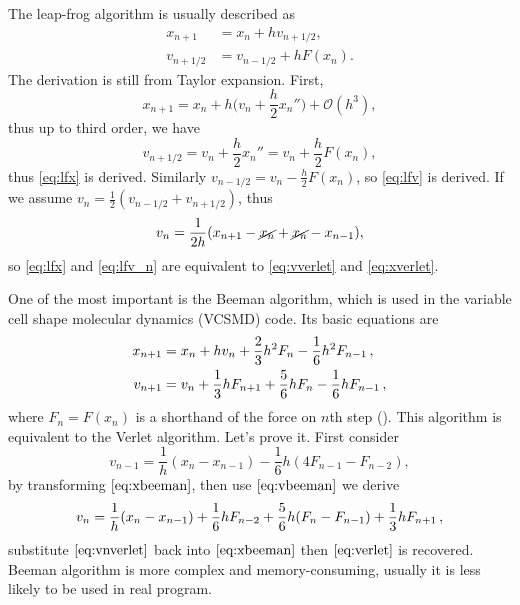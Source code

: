 The leap-frog algorithm is usually described as
\begin{subequations}
	\begin{align}
		x_{n+1}   & = x_n + h v_{n+1/2}, \label{eq:lfx}   \\
		v_{n+1/2} & = v_{n-1/2} + h F(x_n).\label{eq:lfv}
	\end{align}
\end{subequations}
The derivation is still from Taylor expansion. First,
\begin{equation}
	x_{n+1} = x_{n} + h \bigg(v_n + \frac{ h }{ 2 } x_n'' \bigg) + \mathcal{O}(h^3),
\end{equation}
thus up to third order, we have
\begin{equation}
	v_{n + 1/2} = v_n + \frac{ h }{ 2 } x_n'' = v_n + \frac{ h }{ 2 } F(x_n),
\end{equation}
thus \eqref{eq:lfx} is derived.
Similarly $v_{n-1/2} = v_n - \frac{ h }{ 2 } F(x_n)$, so \eqref{eq:lfv} is derived.
If we assume $v_n = \frac{ 1 }{ 2 }(v_{n-1/2} + v_{n+1/2})$, thus
\begin{equation}\label{eq:lfv_n}
	v_n = \frac{ 1 }{ 2h }(x_{n+1} - \cancel{x_n} + \cancel{x_n} - x_{n-1}),
\end{equation}
so \eqref{eq:lfx} and \eqref{eq:lfv_n} are equivalent to \eqref{eq:vverlet} and \eqref{eq:xverlet}.

One of the most important is the Beeman algorithm, which is used in the
variable cell shape molecular dynamics (VCSMD) code.
Its basic equations are
\begin{subequations}\label{eq:beeman}
	\begin{align}
		x_{n+1} & = x_n + h v_n + \frac{ 2 }{ 3 } h^2 F_n - \frac{ 1 }{ 6 } h^2 F_{n-1} \thinspace,
		\label{eq:xbeeman}                                                                             \\
		v_{n+1} & = v_n + \frac{ 1 }{ 3 }h F_{n+1} + \frac{ 5 }{ 6 } h F_n - \frac{ 1 }{ 6 } h F_{n-1}
		\thinspace,
		\label{eq:vbeeman}
	\end{align}
\end{subequations}
where $F_n = F(x_n)$ is a shorthand of the force on $n$th step (\cite{dufty1986molecular}). This algorithm
is equivalent to the Verlet algorithm. Let's prove it. First consider
\begin{equation}
	v_{n-1} = \frac{ 1 }{ h }(x_n - x_{n-1}) - \frac{ 1 }{ 6 } h (4 F_{n-1} - F_{n-2}),
\end{equation}
by transforming $\eqref{eq:xbeeman}$, then use $\eqref{eq:vbeeman}$ we derive
\begin{equation}\label{eq:vnverlet}
	v_n = \frac{ 1 }{ h }(x_n - x_{n-1}) + \frac{ 1 }{ 6 } h F_{n-2} + \frac{ 5 }{ 6 } h (F_n - F_{n-1})
	+ \frac{ 1 }{ 3 }h F_{n+1} \thinspace,
\end{equation}
substitute $\eqref{eq:vnverlet}$ back into $\eqref{eq:xbeeman}$ then $\eqref{eq:verlet}$ is recovered.
Beeman algorithm is more complex and memory-consuming, usually it is less likely to be used in
real program.

